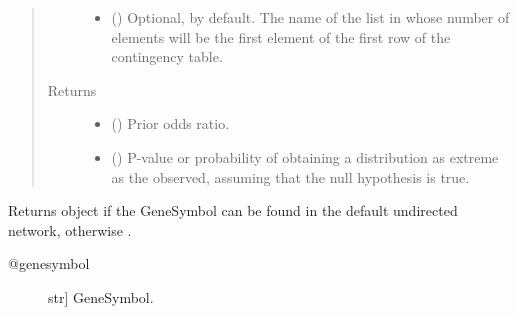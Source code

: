 \documentclass[letterpaper,10pt,english]{sphinxmanual}
\begin{document}
\begin{fulllineitems}
\begin{fulllineitems}
\begin{quote}
\begin{description}
\begin{itemize}
\item {} 
 () \textendash{} Optional,  by default. The name of the list in
 whose number of elements
will be the first element of the first row of the
contingency table.

\end{itemize}

\item[{Returns}] \leavevmode
\begin{itemize}
\item {} 
() \textendash{} Prior odds ratio.

\item {} 
() \textendash{} P-value or probability of obtaining a
distribution as extreme as the observed, assuming that the
null hypothesis is true.

\end{itemize}


\end{description}\end{quote}

\end{fulllineitems}


\begin{fulllineitems}
\label{\detokenize{main:pypath.main.PyPath.geneset_enrichment}}
\end{fulllineitems}


\begin{fulllineitems}
\label{\detokenize{main:pypath.main.PyPath.genesymbol}}
Returns  object if the GeneSymbol
can be found in the default undirected network,
otherwise .
\begin{description}
\item[{@genesymbol}] \leavevmode{[}str{]}
GeneSymbol.


\end{description}
\end{fulllineitems}
\end{fulllineitems}
\end{document}
